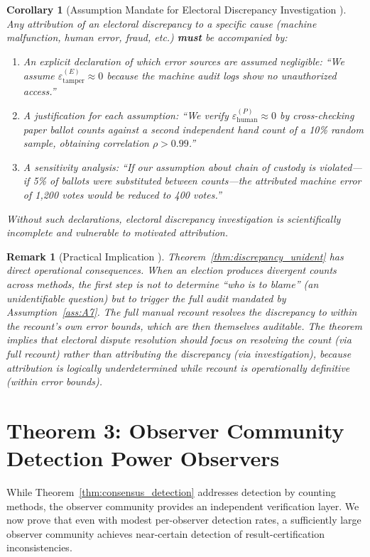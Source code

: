 \documentclass[11pt,a4paper]{article}
\newtheorem{corollary}[theorem]{Corollary}
\newtheorem{remark}[theorem]{Remark}
\theoremstyle{definition}
\begin{document}
\begin{corollary}[Assumption Mandate for Electoral Discrepancy Investigation ]
\label{cor:assumption_mandate}
Any attribution of an electoral discrepancy to a specific cause (machine malfunction, human error, fraud, etc.) \textbf{must} be accompanied by:
\begin{enumerate}[label=(\roman*)]
    \item An explicit declaration of which error sources are assumed negligible: ``We assume $\varepsilon^{(E)}_{\text{tamper}} \approx 0$ because the machine audit logs show no unauthorized access.''
    \item A justification for each assumption: ``We verify $\varepsilon^{(P)}_{\text{human}} \approx 0$ by cross-checking paper ballot counts against a second independent hand count of a 10\% random sample, obtaining correlation $\rho > 0.99$.''
    \item A sensitivity analysis: ``If our assumption about chain of custody is violated---if 5\% of ballots were substituted between counts---the attributed machine error of 1,200 votes would be reduced to 400 votes.''
\end{enumerate}
Without such declarations, electoral discrepancy investigation is scientifically incomplete and vulnerable to motivated attribution.
\end{corollary}
\begin{remark}[Practical Implication ]
\label{rem:unident_practical}
Theorem~\ref{thm:discrepancy_unident} has direct operational consequences. When an election produces divergent counts across methods, the \textit{first} step is not to determine ``who is to blame'' (an unidentifiable question) but to trigger the full audit mandated by Assumption~\ref{ass:A7}. The full manual recount resolves the discrepancy to within the recount's own error bounds, which are then themselves auditable. The theorem implies that electoral dispute resolution should focus on \textit{resolving the count} (via full recount) rather than \textit{attributing the discrepancy} (via investigation), because attribution is logically underdetermined while recount is operationally definitive (within error bounds).
\end{remark}
\section{Theorem 3: Observer Community Detection Power Observers}
\label{sec:thm3}
While Theorem~\ref{thm:consensus_detection} addresses detection by counting methods, the observer community provides an independent verification layer. We now prove that even with modest per-observer detection rates, a sufficiently large observer community achieves near-certain detection of result-certification inconsistencies.
\end{document}
